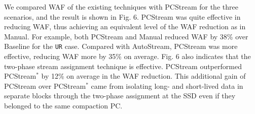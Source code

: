 We compared WAF of the existing techniques with \textsf{\small PCStream} for the three
scenarios, and the result is shown in Fig. 6.  
\textsf{\small PCStream} was quite effective in reducing WAF, 
thus achieving an equivalent level of the WAF reduction as in \textsf{\small Manual}.  
For example, both \textsf{\small PCStream} and \textsf{\small Manual} reduced WAF by 38\% over Baseline for the \texttt{UR} case. 
Compared with \textsf{\small AutoStream}, \textsf{\small PCStream} was more effective, reducing WAF more by 35\% on average.  
Fig. 6 also indicates that the two-phase stream assignment technique is effective.  
\textsf{\small PCStream} outperformed \textsf{\small PCStream$^{*}$} by 12\% on average in the WAF reduction.
This additional gain of \textsf{\small PCStream} over \textsf{\small PCStream$^{*}$} came from isolating long- and short-lived data in separate blocks through the two-phase assignment at the SSD even if they belonged to the same compaction PC.


